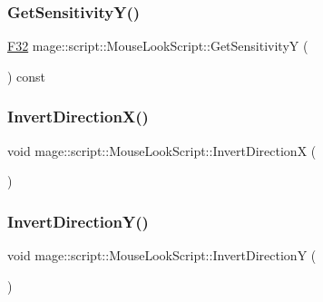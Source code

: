 \hypertarget{classmage_1_1script_1_1_mouse_look_script_a39303e2d535ecc610ac4ea2f23825452}{}\label{classmage_1_1script_1_1_mouse_look_script_a39303e2d535ecc610ac4ea2f23825452} 
\subsubsection{\texorpdfstring{Get\+Sensitivity\+Y()}{GetSensitivityY()}}
{\footnotesize\ttfamily \hyperlink{namespacemage_aa97e833b45f06d60a0a9c4fc22ae02c0}{F32} mage\+::script\+::\+Mouse\+Look\+Script\+::\+Get\+SensitivityY (\begin{DoxyParamCaption}{ }\end{DoxyParamCaption}) const\hspace{0.3cm}{\ttfamily [noexcept]}}

\hypertarget{classmage_1_1script_1_1_mouse_look_script_aa527806c78873eab652dd6337a75b89f}{}\label{classmage_1_1script_1_1_mouse_look_script_aa527806c78873eab652dd6337a75b89f} 
\subsubsection{\texorpdfstring{Invert\+Direction\+X()}{InvertDirectionX()}}
{\footnotesize\ttfamily void mage\+::script\+::\+Mouse\+Look\+Script\+::\+Invert\+DirectionX (\begin{DoxyParamCaption}{ }\end{DoxyParamCaption})\hspace{0.3cm}{\ttfamily [noexcept]}}

\hypertarget{classmage_1_1script_1_1_mouse_look_script_a189145ae96f56b805fe2020ed75db0bc}{}\label{classmage_1_1script_1_1_mouse_look_script_a189145ae96f56b805fe2020ed75db0bc} 
\subsubsection{\texorpdfstring{Invert\+Direction\+Y()}{InvertDirectionY()}}
{\footnotesize\ttfamily void mage\+::script\+::\+Mouse\+Look\+Script\+::\+Invert\+DirectionY (\begin{DoxyParamCaption}{ }\end{DoxyParamCaption})\hspace{0.3cm}{\ttfamily [noexcept]}}

